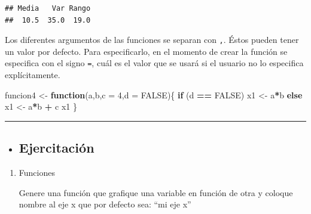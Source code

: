\documentclass[]{book}
\newenvironment{Shaded}{\begin{snugshade}}{\end{snugshade}}
\newcommand{\DataTypeTok}[1]{\textcolor[rgb]{0.13,0.29,0.53}{#1}}
\newcommand{\DecValTok}[1]{\textcolor[rgb]{0.00,0.00,0.81}{#1}}
\newcommand{\StringTok}[1]{\textcolor[rgb]{0.31,0.60,0.02}{#1}}
\newcommand{\OtherTok}[1]{\textcolor[rgb]{0.56,0.35,0.01}{#1}}
\newcommand{\ControlFlowTok}[1]{\textcolor[rgb]{0.13,0.29,0.53}{\textbf{#1}}}
\newcommand{\OperatorTok}[1]{\textcolor[rgb]{0.81,0.36,0.00}{\textbf{#1}}}
\newcommand{\NormalTok}[1]{#1}
\newenvironment{rmdblock}[1]
{\begin{shaded*}
		\begin{itemize}
			\renewcommand{\labelitemi}{
				\raisebox{-.7\height}[0pt][0pt]{
					{\setkeys{Gin}{width=3em,keepaspectratio}\texttt{[image: images/\#1]}}
				}
			}
			\item
		}
		{
		\end{itemize}
	\end{shaded*}
}
\newenvironment{rmdtip}
{\begin{rmdblock}{tip}}
	{\end{rmdblock}}
\begin{document}
\begin{verbatim}
## Media   Var Rango 
##  10.5  35.0  19.0
\end{verbatim}

Los diferentes argumentos de las funciones se separan con \texttt{,}.
Éstos pueden tener un valor por defecto. Para especificarlo, en el
momento de crear la función se especifica con el signo \texttt{=}, cuál
es el valor que se usará si el usuario no lo especifica explícitamente.

\begin{Shaded}
\begin{Highlighting}[]
\NormalTok{funcion4 <-}\StringTok{ }\ControlFlowTok{function}\NormalTok{(a,b,}\DataTypeTok{c =} \DecValTok{4}\NormalTok{,}\DataTypeTok{d =} \OtherTok{FALSE}\NormalTok{)\{}
  \ControlFlowTok{if}\NormalTok{ (d }\OperatorTok{==}\StringTok{ }\OtherTok{FALSE}\NormalTok{) x1 <-}\StringTok{ }\NormalTok{a}\OperatorTok{*}\NormalTok{b }\ControlFlowTok{else}\NormalTok{ x1 <-}\StringTok{ }\NormalTok{a}\OperatorTok{*}\NormalTok{b }\OperatorTok{+}\StringTok{ }\NormalTok{c}
\NormalTok{  x1}
\NormalTok{\}}
\end{Highlighting}
\end{Shaded}

\begin{center}\rule{0.5\linewidth}{\linethickness}\end{center}

\begin{rmdtip}
\subsection{Ejercitación}\label{ejercitacion}
\end{rmdtip}

\begin{boxeda}
\begin{enumerate}
\def\labelenumi{\arabic{enumi}.}
\item
  Funciones

  Genere una función que grafique una variable en función de otra y
  coloque nombre al eje x que por defecto sea: ``mi eje x''
\end{enumerate}
\end{boxeda}


\end{document}
